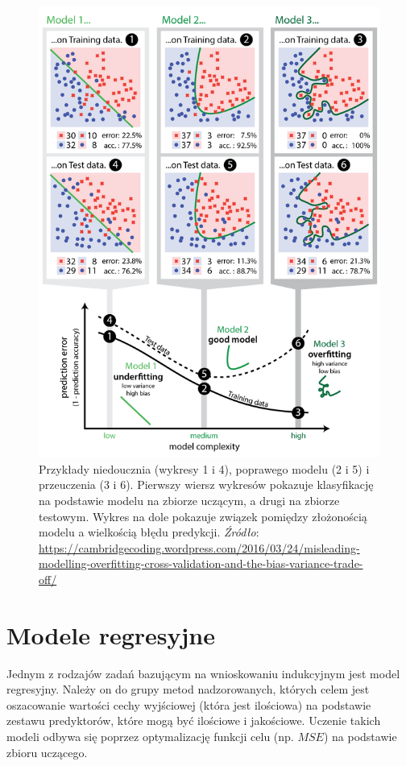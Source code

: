 \documentclass[]{book}
\theoremstyle{plain}
\theoremstyle{definition}
\begin{document}
\begin{figure}
\centering
\includegraphics{images/unde_over_fitting.JPG}
\caption{\label{fig:unnamed-chunk-10}Przykłady niedoucznia (wykresy 1 i 4), poprawego modelu (2 i 5) i przeuczenia (3 i 6). Pierwszy wiersz wykresów pokazuje klasyfikację na podstawie modelu na zbiorze uczącym, a drugi na zbiorze testowym. Wykres na dole pokazuje związek pomiędzy złożonością modelu a wielkością błędu predykcji. \emph{Źródło}: \url{https://cambridgecoding.wordpress.com/2016/03/24/misleading-modelling-overfitting-cross-validation-and-the-bias-variance-trade-off/}}
\end{figure}

\hypertarget{modele-regresyjne}{%
\section{Modele regresyjne}\label{modele-regresyjne}}

Jednym z rodzajów zadań bazującym na wnioskowaniu indukcyjnym jest model regresyjny. Należy on do grupy metod nadzorowanych, których celem jest oszacowanie wartości cechy wyjściowej (która jest ilościowa) na podstawie zestawu predyktorów, które mogą być ilościowe i jakościowe. Uczenie takich modeli odbywa się poprzez optymalizację funkcji celu (np. \(MSE\)) na podstawie zbioru uczącego.
\end{document}
